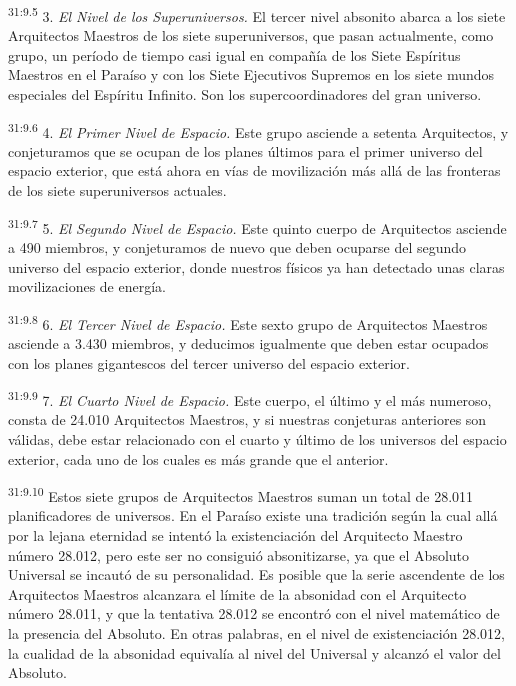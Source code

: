 \par
\textsuperscript{31:9.5} 3. \textit{El Nivel de los Superuniversos.} El tercer nivel absonito abarca a los siete Arquitectos Maestros de los siete superuniversos, que pasan actualmente, como grupo, un período de tiempo casi igual en compañía de los Siete Espíritus Maestros en el Paraíso y con los Siete Ejecutivos Supremos en los siete mundos especiales del Espíritu Infinito. Son los supercoordinadores del gran universo.

\par
\textsuperscript{31:9.6} 4. \textit{El Primer Nivel de Espacio.} Este grupo asciende a setenta Arquitectos, y conjeturamos que se ocupan de los planes últimos para el primer universo del espacio exterior, que está ahora en vías de movilización más allá de las fronteras de los siete superuniversos actuales.

\par
\textsuperscript{31:9.7} 5. \textit{El Segundo Nivel de Espacio.} Este quinto cuerpo de Arquitectos asciende a 490 miembros, y conjeturamos de nuevo que deben ocuparse del segundo universo del espacio exterior, donde nuestros físicos ya han detectado unas claras movilizaciones de energía.

\par
\textsuperscript{31:9.8} 6. \textit{El Tercer Nivel de Espacio.} Este sexto grupo de Arquitectos Maestros asciende a 3.430 miembros, y deducimos igualmente que deben estar ocupados con los planes gigantescos del tercer universo del espacio exterior.

\par
\textsuperscript{31:9.9} 7. \textit{El Cuarto Nivel de Espacio.} Este cuerpo, el último y el más numeroso, consta de 24.010 Arquitectos Maestros, y si nuestras conjeturas anteriores son válidas, debe estar relacionado con el cuarto y último de los universos del espacio exterior, cada uno de los cuales es más grande que el anterior.

\par
\textsuperscript{31:9.10} Estos siete grupos de Arquitectos Maestros suman un total de
28.011 planificadores de universos. En el Paraíso existe una tradición según la cual allá por la lejana eternidad se intentó la existenciación del Arquitecto Maestro número 28.012, pero este ser no consiguió absonitizarse, ya que el Absoluto Universal se incautó de su personalidad. Es posible que la serie ascendente de los Arquitectos Maestros alcanzara el límite de la absonidad con el Arquitecto número 28.011, y que la tentativa 28.012 se encontró con el nivel matemático de la presencia del Absoluto. En otras palabras, en el nivel de existenciación 28.012, la cualidad de la absonidad equivalía al nivel del Universal y alcanzó el valor del Absoluto.

